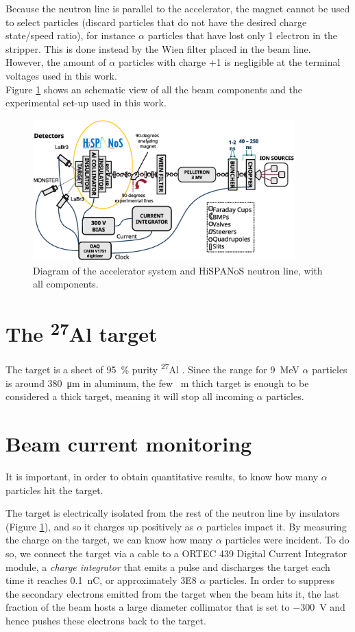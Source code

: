 \documentclass[a4paper,12pt]{report}
\newcommand{\Aliso}{\textsuperscript{27}Al }
\begin{document}
Because the neutron line is parallel to the accelerator, the magnet cannot be used to select particles (discard particles that do not have the desired charge state/speed ratio), for instance $\alpha$ particles that have lost only 1 electron in the stripper.
This is done instead by the Wien filter placed in the beam line.
However, the amount of $\alpha$ particles with charge +1 is negligible at the terminal voltages used in this work.
\\

Figure \ref{tandemdiagrama} shows an schematic view of all the beam components and the experimental set-up used in this work.

\begin{figure}[H]
	\centering
	\includegraphics[width=0.90\textwidth]{tandemdiagrama.eps}	%
	\caption{Diagram of the accelerator system and HiSPANoS neutron line, with all components.}
	\label{tandemdiagrama}
\end{figure}

\section{The \Aliso target}
The target is a sheet of \qty{95}{\percent} purity \Aliso.
Since the range for 9~MeV $\alpha$ particles is around \qty{380}{\micro\m} in aluminum, the few \unit{\mili\m} thich target is enough to be considered a thick target, meaning it will stop all incoming $\alpha$ particles.
\\

\section{Beam current monitoring}
It is important, in order to obtain quantitative results, to know how many $\alpha$ particles hit the target.

The target is electrically isolated from the rest of the neutron line by insulators (Figure \ref{tandemdiagrama}), and so it charges up positively as $\alpha$ particles impact it.
By measuring the charge on the target, we can know how many $\alpha$ particles were incident.
To do so, we connect the target via a cable to a ORTEC 439 Digital Current Integrator module, a \textit{charge integrator} that emits a pulse and discharges the target each time it reaches \qty{0.1}{\nano\coulomb}, or approximately \num{3E8} $\alpha$ particles.
In order to suppress the secondary electrons emitted from the target when the beam hits it, the last fraction of the beam hosts a large diameter collimator that is set to \qty{-300}{\V} and hence pushes these electrons back to the target.
\end{document}
